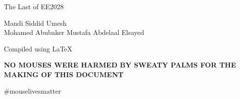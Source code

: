 \documentclass[a4 paper, 12pt]{article}
\begin{document}
\begin{titlepage}
\begin{center}
    The Last of EE2028

    \vspace{1.5cm}

    Mandi Siddid Umesh  \\
    Mohamed Abubaker Mustafa Abdelaal Elsayed

    \vspace{1cm}
    Compiled using \LaTeX 

    \vspace{1cm}

    \textbf{NO MOUSES WERE HARMED BY SWEATY PALMS FOR THE MAKING OF THIS
    DOCUMENT}

    \#mouselivesmatter
\end{center}
\end{titlepage}
\end{document}
